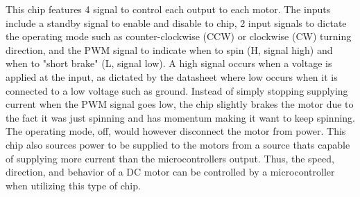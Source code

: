 \documentclass[12pt]{article}
\begin{document}
This chip features 4 signal to control each output to each motor. The inputs include a standby signal to enable and disable to chip, 2 input signals to dictate the operating mode such as counter-clockwise (CCW) or clockwise (CW) turning direction, and the PWM signal to indicate when to spin (H, signal high) and when to "short brake" (L, signal low). A high signal occurs when a voltage is applied at the input, as dictated by the datasheet where low occurs when it is connected to a low voltage such as ground. Instead of simply stopping supplying current when the PWM signal goes low, the chip slightly brakes the motor due to the fact it was just spinning and has momentum making it want to keep spinning. The operating mode, off, would however disconnect the motor from power. This chip also sources power to be supplied to the motors from a source thats capable of supplying more current than the microcontrollers output. Thus, the speed, direction, and behavior of a DC motor can be controlled by a microcontroller when utilizing this type of chip.
\end{document}
